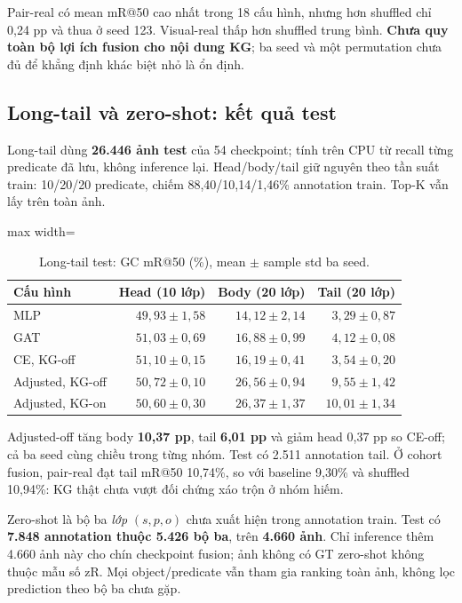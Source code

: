 Pair-real có mean mR@50 cao nhất trong 18 cấu hình, nhưng hơn shuffled
chỉ 0,24 pp và thua ở seed 123. Visual-real thấp hơn shuffled trung bình.
\textbf{Chưa quy toàn bộ lợi ích fusion cho nội dung KG};
ba seed và một permutation chưa đủ để khẳng định khác biệt nhỏ là ổn định.


\subsection{Long-tail và zero-shot: kết quả test}
Long-tail dùng \textbf{26.446 ảnh test} của 54 checkpoint; tính trên CPU từ
recall từng predicate đã lưu, không inference lại.
Head/body/tail giữ nguyên theo tần suất train: 10/20/20 predicate,
chiếm 88,40/10,14/1,46\% annotation train. Top-K vẫn lấy trên toàn ảnh.

\begin{table}[!ht]\centering\small
\caption{Long-tail test: GC mR@50 (\%), mean $\pm$ sample std ba seed.}\label{tab:tail}
\begin{adjustbox}{max width=\linewidth}\begin{tabular}{@{}lrrr@{}}\toprule
Cấu hình & Head (10 lớp) & Body (20 lớp) & Tail (20 lớp)\\\midrule
MLP & $49,93\pm1,58$ & $14,12\pm2,14$ & $3,29\pm0,87$\\
GAT & $51,03\pm0,69$ & $16,88\pm0,99$ & $4,12\pm0,08$\\
CE, KG-off & $51,10\pm0,15$ & $16,19\pm0,41$ & $3,54\pm0,20$\\
Adjusted, KG-off & $50,72\pm0,10$ & $26,56\pm0,94$ & $9,55\pm1,42$\\
Adjusted, KG-on & $50,60\pm0,30$ & $26,37\pm1,37$ & $10,01\pm1,34$\\
\bottomrule\end{tabular}\end{adjustbox}\end{table}

Adjusted-off tăng body \textbf{10,37 pp}, tail \textbf{6,01 pp} và giảm head
0,37 pp so CE-off; cả ba seed cùng chiều trong từng nhóm.
Test có 2.511 annotation tail. Ở cohort fusion, pair-real đạt tail mR@50
10,74\%, so với baseline 9,30\% và shuffled 10,94\%:
KG thật chưa vượt đối chứng xáo trộn ở nhóm hiếm.

Zero-shot là bộ ba \emph{lớp} $(s,p,o)$ chưa xuất hiện trong annotation train.
Test có \textbf{7.848 annotation thuộc 5.426 bộ ba}, trên \textbf{4.660 ảnh}.
Chỉ inference thêm 4.660 ảnh này cho chín checkpoint fusion;
ảnh không có GT zero-shot không thuộc mẫu số zR. Mọi object/predicate vẫn tham gia
ranking toàn ảnh, không lọc prediction theo bộ ba chưa gặp.

